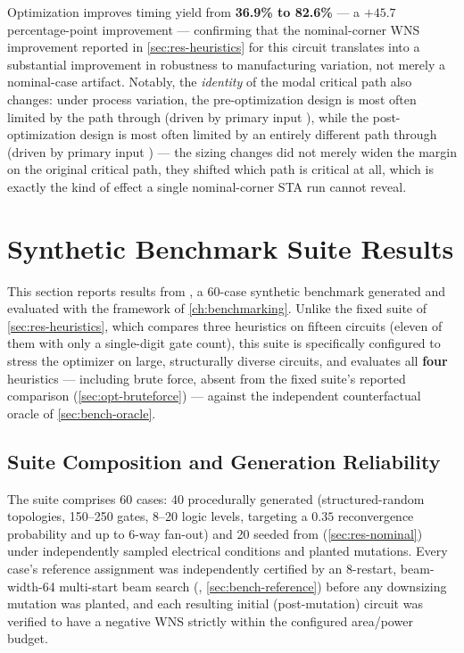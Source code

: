 Optimization improves timing yield from \textbf{36.9\% to 82.6\%} --- a
$+45.7$ percentage-point improvement --- confirming that the
nominal-corner WNS improvement reported in \cref{sec:res-heuristics} for
this circuit translates into a substantial improvement in robustness to
manufacturing variation, not merely a nominal-case artifact. Notably, the
\emph{identity} of the modal critical path also changes: under process
variation, the pre-optimization design is most often limited by the path
through  (driven by primary input ), while the
post-optimization design is most often limited by an entirely different
path through  (driven by primary input ) --- the
sizing changes did not merely widen the margin on the original critical
path, they shifted which path is critical at all, which is exactly the
kind of effect a single nominal-corner STA run cannot reveal.

\section{Synthetic Benchmark Suite Results}
\label{sec:res-benchmarking}
 
This section reports results from , a 60-case
synthetic benchmark generated and evaluated with the framework of
\cref{ch:benchmarking}. Unlike the fixed suite of \cref{sec:res-heuristics},
which compares three heuristics on fifteen circuits (eleven of them with only
a single-digit gate count), this suite is specifically configured to stress
the optimizer on large, structurally diverse circuits, and evaluates all
\textbf{four} heuristics --- including brute force, absent from the fixed
suite's reported comparison (\cref{sec:opt-bruteforce}) --- against the
independent counterfactual oracle of \cref{sec:bench-oracle}.
 
\subsection{Suite Composition and Generation Reliability}
\label{sec:res-bench-generation}

The suite comprises 60 cases: 40 procedurally generated (structured-random
topologies, 150--250 gates, 8--20 logic levels, targeting a
$0.35$ reconvergence probability and up to 6-way fan-out) and 20 seeded
from  (\cref{sec:res-nominal}) under
independently sampled electrical conditions and planted mutations. Every
case's reference assignment was independently certified by an 8-restart,
beam-width-64 multi-start beam search (,
\cref{sec:bench-reference}) before any downsizing mutation was planted, and
each resulting initial (post-mutation) circuit was verified to have a
negative WNS strictly within the configured area/power budget.
 
